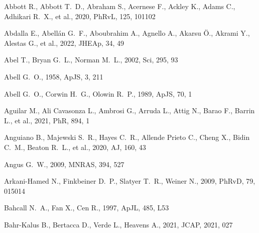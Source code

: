 \documentclass[fleqn,12pt]{article}
\begin{document}
\begin{thebibliography}{}
 Abbott R., Abbott T.~D., Abraham S., Acernese F., Ackley K., Adams C., Adhikari R.~X., et al., 2020, PhRvL, 125, 101102


 Abdalla E., Abell{\'a}n G.~F., Aboubrahim A., Agnello A., Akarsu {\"O}., Akrami Y., Alestas G., et al., 2022, JHEAp, 34, 49

 Abel T., Bryan G.~L., Norman M.~L., 2002, Sci, 295, 93

 Abell G.~O., 1958, ApJS, 3, 211

 Abell G.~O., Corwin H.~G., Olowin R.~P., 1989, ApJS, 70, 1

 Aguilar M., Ali Cavasonza L., Ambrosi G., Arruda L., Attig N., Barao F., Barrin L., et al., 2021, PhR, 894, 1

 Anguiano B., Majewski S.~R., Hayes C.~R., Allende Prieto C., Cheng X., Bidin C.~M., Beaton R.~L., et al., 2020, AJ, 160, 43

 Angus G.~W., 2009, MNRAS, 394, 527

 Arkani-Hamed N., Finkbeiner D.~P., Slatyer T.~R., Weiner N., 2009, PhRvD, 79, 015014


 Bahcall N.~A., Fan X., Cen R., 1997, ApJL, 485, L53

 Bahr-Kalus B., Bertacca D., Verde L., Heavens A., 2021, JCAP, 2021, 027 


\end{thebibliography}
\end{document}

